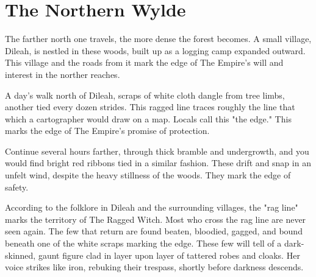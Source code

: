 \section{The Northern Wylde}

The farther north one travels, the more dense the forest becomes.
A small village, Dileah, is nestled in these woods, built up as a logging camp expanded outward.
This village and the roads from it mark the edge of The Empire's will and interest in the norther
  reaches.

A day's walk north of Dileah, scraps of white cloth dangle from tree limbs, another tied every
  dozen strides.
This ragged line traces roughly the line that which a cartographer would draw on a map.
Locals call this "the edge."
This marks the edge of The Empire's promise of protection.

Continue several hours farther, through thick bramble and undergrowth, and you would find
  bright red ribbons tied in a similar fashion.
These drift and snap in an unfelt wind, despite the heavy stillness of the woods.
They mark the edge of safety.

According to the folklore in Dileah and the surrounding villages, the "rag line" marks the territory
  of The Ragged Witch.
Most who cross the rag line are never seen again.
The few that return are found beaten, bloodied, gagged, and bound beneath one of the
  white scraps marking the edge.
These few will tell of a dark-skinned, gaunt figure clad in layer upon layer of tattered robes and
  cloaks.
Her voice strikes like iron, rebuking their trespass, shortly before darkness descends.
